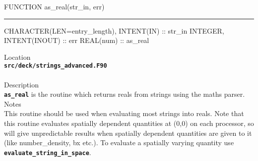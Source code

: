\documentclass[12pt,a4paper]{article}
\newcommand{\HRule}{\rule[0.3cm]{\linewidth}{0.5mm}}
\newcommand{\inlinecode}[1]{{\color{warwickred} \bf\texttt{#1}}}
\begin{document}
\pagebreak
\begin{codedef}
FUNCTION as_real(str_in, err)
\HRule
CHARACTER(LEN=entry_length), INTENT(IN) :: str_in
INTEGER, INTENT(INOUT) :: err
REAL(num) :: as_real
\end{codedef}
\vspace{1cm}
{\Large Location\\}
\inlinecode{src/deck/strings\_advanced.F90}\\
\\[0.5cm]
{\Large Description\\}
\inlinecode{as\_real} is the routine which returns reals from strings using the
maths parser.
\\[0.5cm]
{\Large Notes\\}
This routine should be used when evaluating most strings into reals. Note that
this routine evaluates spatially dependent quantities at (0,0) on each
processor, so will give unpredictable results when spatially dependent
quantities are given to it (like number\_density, bx etc.). To evaluate a spatially varying
quantity use \inlinecode{evaluate\_string\_in\_space}.
\end{document}
